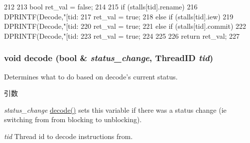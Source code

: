 \begin{DoxyCode}
212 {
213     bool ret_val = false;
214 
215     if (stalls[tid].rename) {
216         DPRINTF(Decode,"[tid:%
217         ret_val = true;
218     } else if (stalls[tid].iew) {
219         DPRINTF(Decode,"[tid:%
220         ret_val = true;
221     } else if (stalls[tid].commit) {
222         DPRINTF(Decode,"[tid:%
223         ret_val = true;
224     }
225 
226     return ret_val;
227 }
\end{DoxyCode}
\hypertarget{classDefaultDecode_a9632c526b9379a21d93cf2021090f194}{
\subsubsection[{decode}]{\setlength{\rightskip}{0pt plus 5cm}void decode (bool \& {\em status\_\-change}, \/  {\bf ThreadID} {\em tid})}}
\label{classDefaultDecode_a9632c526b9379a21d93cf2021090f194}
Determines what to do based on decode's current status. 
\begin{DoxyParams}{引数}
\item[{\em status\_\-change}]\hyperlink{classDefaultDecode_a9632c526b9379a21d93cf2021090f194}{decode()} sets this variable if there was a status change (ie switching from from blocking to unblocking). \item[{\em tid}]Thread id to decode instructions from. \end{DoxyParams}



